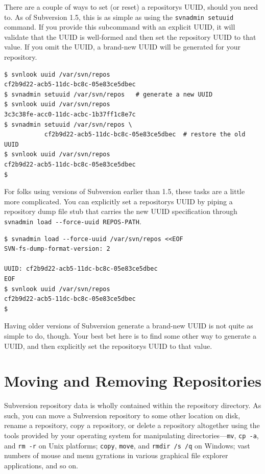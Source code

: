 There are a couple of ways to set (or reset) a
repository\textquotesingle s UUID, should you need to. As of Subversion
1.5, this is as simple as using the \texttt{svnadmin\ setuuid} command.
If you provide this subcommand with an explicit UUID, it will validate
that the UUID is well-formed and then set the repository UUID to that
value. If you omit the UUID, a brand-new UUID will be generated for your
repository.

\begin{verbatim}
$ svnlook uuid /var/svn/repos
cf2b9d22-acb5-11dc-bc8c-05e83ce5dbec
$ svnadmin setuuid /var/svn/repos   # generate a new UUID
$ svnlook uuid /var/svn/repos
3c3c38fe-acc0-11dc-acbc-1b37ff1c8e7c
$ svnadmin setuuid /var/svn/repos \
           cf2b9d22-acb5-11dc-bc8c-05e83ce5dbec  # restore the old UUID
$ svnlook uuid /var/svn/repos
cf2b9d22-acb5-11dc-bc8c-05e83ce5dbec
$
\end{verbatim}

For folks using versions of Subversion earlier than 1.5, these tasks are
a little more complicated. You can explicitly set a
repository\textquotesingle s UUID by piping a repository dump file stub
that carries the new UUID specification through
\texttt{svnadmin\ load\ -\/-force-uuid\ REPOS-PATH}.

\begin{verbatim}
$ svnadmin load --force-uuid /var/svn/repos <<EOF
SVN-fs-dump-format-version: 2

UUID: cf2b9d22-acb5-11dc-bc8c-05e83ce5dbec
EOF
$ svnlook uuid /var/svn/repos
cf2b9d22-acb5-11dc-bc8c-05e83ce5dbec
$
\end{verbatim}

Having older versions of Subversion generate a brand-new UUID is not
quite as simple to do, though. Your best bet here is to find some other
way to generate a UUID, and then explicitly set the
repository\textquotesingle s UUID to that value.

\section{Moving and Removing
Repositories}\label{svn.reposadmin.maint.moving-and-removing}

Subversion repository data is wholly contained within the repository
directory. As such, you can move a Subversion repository to some other
location on disk, rename a repository, copy a repository, or delete a
repository altogether using the tools provided by your operating system
for manipulating directories---\texttt{mv}, \texttt{cp\ -a}, and
\texttt{rm\ -r} on Unix platforms; \texttt{copy}, \texttt{move}, and
\texttt{rmdir\ /s\ /q} on Windows; vast numbers of mouse and menu
gyrations in various graphical file explorer applications, and so on.


